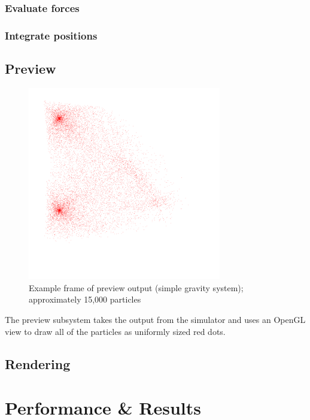 \documentclass{acmsiggraph}
\begin{document}
\subsubsection{Evaluate forces}

\subsubsection{Integrate positions}

\subsection{Preview}

\begin{figure}
    \includegraphics[width=84.5mm]{preview.png}
    \caption{Example frame of preview output (simple gravity system); approximately 15,000 particles}
    \label{fig:preview}
\end{figure}

The preview subsystem takes the output from the simulator and uses an OpenGL view to draw all of the particles as uniformly sized red dots.

\subsection{Rendering}

\section{Performance \& Results}

\label{performanceSection}
\end{document}
